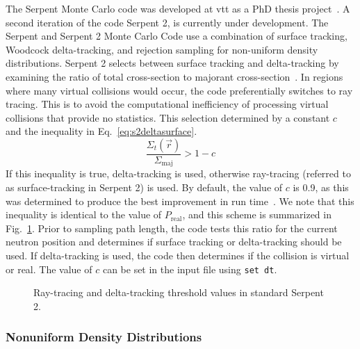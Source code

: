 The Serpent Monte Carlo code was developed at \gls{vtt} as a PhD
thesis project~\cite{leppanen2007}. A second iteration of the code
Serpent 2, is currently under development. The Serpent and Serpent 2
Monte Carlo Code use a combination of surface tracking, Woodcock
delta-tracking, and rejection sampling for non-uniform density
distributions. Serpent 2 selects between surface tracking and
delta-tracking by examining the ratio of total cross-section to
majorant cross-section~\cite{leppanen2010}. In regions where many
virtual collisions would occur, the code preferentially switches to
ray tracing. This is to avoid the computational inefficiency of
processing virtual collisions that provide no statistics. This
selection determined by a constant $c$ and the inequality in
Eq.~\eqref{eq:s2deltasurface}.
\begin{equation}
  \label{eq:s2deltasurface}
  \frac{\Sigma_t(\vec{r})}{\Sigma_\mathrm{maj}} > 1 - c
\end{equation}
If this inequality is true, delta-tracking is used, otherwise
ray-tracing (referred to as surface-tracking in Serpent 2) is used. By
default, the value of $c$ is 0.9, as this was determined to produce
the best improvement in run time~\cite{leppanen2010}. We note that
this inequality is identical to the value of $P_\mathrm{real}$, and
this scheme is summarized in Fig.~\ref{fig:ray_wdt_normal}.  Prior to
sampling path length, the code tests this ratio for the current
neutron position and determines if surface tracking or delta-tracking
should be used. If delta-tracking is used, the code then determines if
the collision is virtual or real. The value of $c$ can be set in the
input file using \verb|set dt|.
\begin{figure}[hbtp]\centering
  \caption{Ray-tracing and delta-tracking threshold values in
    standard Serpent 2.}
  \label{fig:ray_wdt_normal}
\end{figure}

\subsubsection{Nonuniform Density Distributions}
\label{sec:nonuniform}

